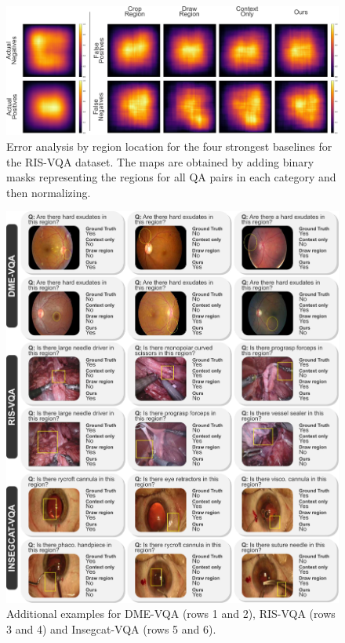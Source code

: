 \begin{figure}[!h]
\begin{center}
\includegraphics[width=\textwidth]{Figures/Part1_LocVQA/02_llm/supplementary_errors_by_location.pdf}
\caption{Error analysis by region location for the four strongest baselines for the RIS-VQA dataset. The maps are obtained by adding binary masks representing the regions for all QA pairs in each category and then normalizing.}
\label{fig:supplementary_errors_by_location}
\end{center}
\end{figure}

\begin{figure}[!h]
\begin{center}
\includegraphics[width=\textwidth]{Figures/Part1_LocVQA/02_llm/examples_supplementary.pdf}
\caption{Additional examples for DME-VQA (rows 1 and 2), RIS-VQA (rows 3 and 4) and Insegcat-VQA (rows 5 and 6).}
\label{fig:examples_supplementary_dme}
\end{center}
\end{figure}